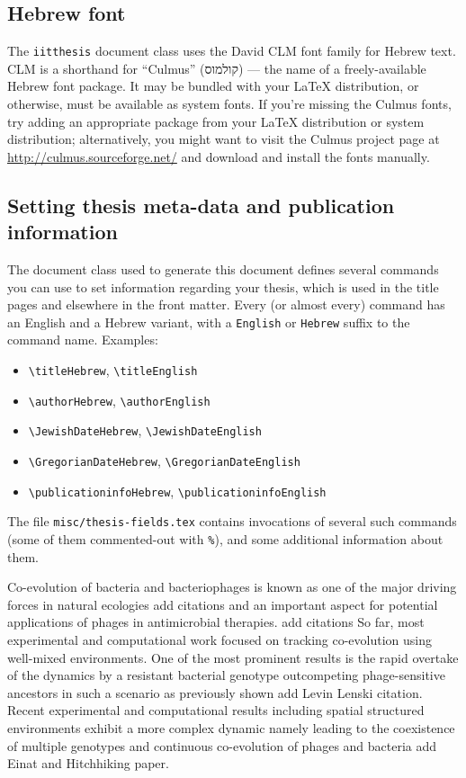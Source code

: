\subsection*{Hebrew font}

The \texttt{iitthesis} document class uses the David CLM font family for Hebrew text. CLM is a shorthand for ``Culmus'' (\texthebrew{קולמוס}) --- the name of a freely-available Hebrew font package. It may be bundled with your LaTeX distribution, or otherwise, must be available as system fonts. If you're missing the Culmus fonts, try adding an appropriate package from your LaTeX distribution or system distribution; alternatively, you might want to visit the Culmus project page at \url{http://culmus.sourceforge.net/} and download and install the fonts manually.

\subsection*{Setting thesis meta-data and publication information}

The document class used to generate this document defines several commands you can use to set information  regarding your thesis, which is used in the title pages and elsewhere in the front matter.  Every (or almost every) command has an English and a Hebrew variant, with a \texttt{English} or \texttt{Hebrew} suffix to the command name. Examples:
\begin{itemize}
\item \verb|\titleHebrew|, \verb|\titleEnglish|
\item \verb|\authorHebrew|, \verb|\authorEnglish|
\item \verb|\JewishDateHebrew|, \verb|\JewishDateEnglish|
\item \verb|\GregorianDateHebrew|, \verb|\GregorianDateEnglish|
\item \verb|\publicationinfoHebrew|, \verb|\publicationinfoEnglish|
\end{itemize}

The file \texttt{misc/thesis-fields.tex} contains invocations of several such commands (some of them commented-out with \texttt{\%}), and some additional information about them.

Co-evolution of bacteria and bacteriophages is known as one of the major driving forces in natural ecologies {\color{red} add citations} and an important aspect for potential applications of phages in antimicrobial therapies. {\color{red} add citations} So far, most experimental and computational work focused on tracking co-evolution using well-mixed environments. One of the most prominent results is the rapid overtake of the dynamics by a resistant bacterial genotype outcompeting phage-sensitive ancestors in such a scenario as previously shown {\color{red} add Levin Lenski citation}. Recent experimental and computational results including spatial structured environments exhibit a more complex dynamic namely leading to the coexistence of multiple genotypes and continuous co-evolution of phages and bacteria {\color{red} add Einat and Hitchhiking paper}.

